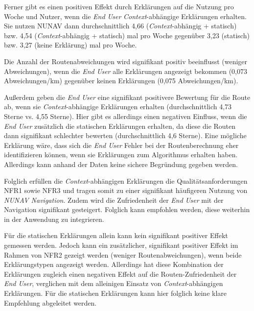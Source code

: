 Ferner gibt es einen positiven Effekt durch Erklärungen auf die Nutzung pro Woche und Nutzer, wenn die \textit{End User} \textit{Context}-abhängige Erklärungen erhalten. Sie nutzen NUNAV dann durchschnittlich 4,66 (\textit{Context}-abhängig + statisch) bzw. 4,54 (\textit{Context}-abhängig + statisch) mal pro Woche gegenüber 3,23 (statisch) bzw. 3,27 (keine Erklärung) mal pro Woche.

Die Anzahl der Routenabweichungen wird signifikant positiv beeinflusst (weniger Abweichungen), wenn die \textit{End User} alle Erklärungen angezeigt bekommen (0,073 Abweichungen/km) gegenüber keinen Erklärungen (0,075 Abweichungen/km). 

Außerdem geben die \textit{End User} eine signifikant positivere Bewertung für die Route ab, wenn sie \textit{Context}-abhängige Erklärungen erhalten (durchschnittlich 4,73 Sterne vs. 4,55 Sterne). Hier gibt es allerdings einen negativen Einfluss, wenn die \textit{End User} zusätzlich die statischen Erklärungen erhalten, da diese die Routen dann signifikant schlechter bewerten (durchschnittlich 4,6 Sterne). Eine mögliche Erklärung wäre, dass sich die \textit{End User} Fehler bei der Routenberechnung eher identifizieren können, wenn sie Erklärungen zum Algorithmus erhalten haben. Allerdings kann anhand der Daten keine sichere Begründung gegeben werden.

Folglich erfüllen die \textit{Context}-abhängigen Erklärungen die Qualitätsanforderungen NFR1 sowie NFR3 und tragen somit zu einer signifikant häufigeren Nutzung von \textit{NUNAV Navigation}. Zudem wird die Zufriedenheit der \textit{End User} mit der Navigation signifikant gesteigert. Folglich kann empfohlen werden, diese weiterhin in der Anwendung zu integrieren.

Für die statischen Erklärungen allein kann kein signifikant positiver Effekt gemessen werden. Jedoch kann ein zusätzlicher, signifikant positiver Effekt im Rahmen von NFR2 gezeigt werden (weniger Routenabweichungen), wenn beide Erklärungstypen angezeigt werden. Allerdings hat diese Kombination der Erklärungen zugleich einen negativen Effekt auf die Routen-Zufriedenheit der \textit{End User}, verglichen mit dem alleinigen Einsatz von \textit{Context}-abhängigen Erklärungen. Für die statischen Erklärungen kann hier folglich keine klare Empfehlung abgeleitet werden.